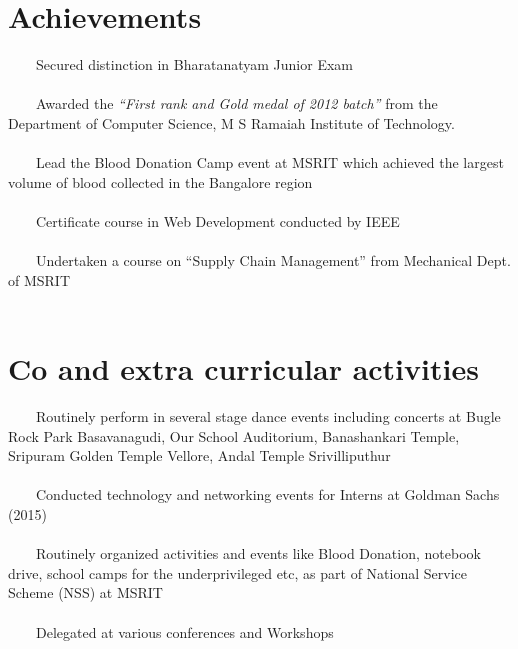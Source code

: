 \documentclass[a4paper,10pt]{article} %
\newcommand{\tabitem}{~~\llap{\textbullet}~~}
\begin{document}
\newpage

\section{Achievements}
\tabitem Secured distinction in Bharatanatyam Junior Exam  \\
\\
\tabitem Awarded the \textit{“First rank and Gold medal of 2012 batch”} from the Department of Computer Science, M S Ramaiah Institute of Technology.\\
\\
\tabitem Lead the Blood Donation Camp event at MSRIT which achieved the largest volume of blood collected in the Bangalore region\\
\\
\tabitem Certificate course in Web Development conducted by IEEE \\
\\
\tabitem Undertaken a course on “Supply Chain Management” from Mechanical Dept. of MSRIT\\
\\


\section{Co and extra curricular activities}
\tabitem Routinely perform in several stage dance events including concerts at Bugle Rock Park Basavanagudi, Our School Auditorium, Banashankari Temple, Sripuram Golden Temple Vellore, Andal Temple Srivilliputhur\\
\\
\tabitem Conducted technology and networking events for Interns at Goldman Sachs (2015)\\
\\
\tabitem Routinely organized activities and events like Blood Donation, notebook drive, school camps for the underprivileged etc, as part of National Service Scheme (NSS) at MSRIT\\
\\ 
\tabitem Delegated at various conferences and Workshops\\
\\
\end{document}
